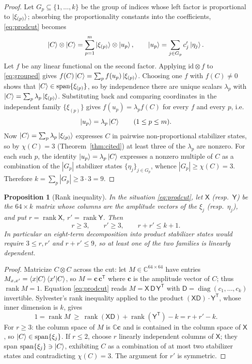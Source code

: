 \documentclass[11pt]{article}
\theoremstyle{plain}
\newtheorem{proposition}[theorem]{Proposition}
\theoremstyle{definition}
\newcommand{\C}{\mathbb{C}}
\newcommand{\rank}{\operatorname{rank}}
\newcommand{\spn}{\operatorname{span}}
\begin{document}
\begin{proof}
Let $G_p\subseteq\{1,\dots,k\}$ be the group of indices whose left factor is
proportional to $\ket{\xi_{(p)}}$; absorbing the proportionality constants into the
coefficients, \eqref{eq:prodcut} becomes
\begin{equation}\label{eq:grouped}
\ket C\otimes\ket C=\sum_{p=1}^m \ket{\xi_{(p)}}\otimes\ket{u_p},
\qquad \ket{u_p}=\sum_{j\in G_p}c_j'\ket{\eta_j}.
\end{equation}
Let $f$ be any linear functional on the second factor. Applying
$\mathrm{id}\otimes f$ to \eqref{eq:grouped} gives
$f(C)\ket C=\sum_p f(u_p)\ket{\xi_{(p)}}$. Choosing one $f$ with $f(C)\ne0$ shows
that $\ket C\in\spn\{\xi_{(p)}\}$, so by independence there are unique scalars
$\lambda_p$ with $\ket C=\sum_p\lambda_p\ket{\xi_{(p)}}$. Substituting back and
comparing coordinates in the independent family $\{\xi_{(p)}\}$ gives
$f(u_p)=\lambda_pf(C)$ for every $f$ and every $p$, i.e.
\[
\ket{u_p}=\lambda_p\ket C\qquad(1\le p\le m).
\]
Now $\ket C=\sum_p\lambda_p\ket{\xi_{(p)}}$ expresses $C$ in pairwise
non-proportional stabilizer states, so by $\chi(C)=3$ (Theorem~\ref{thm:cited}) at
least three of the $\lambda_p$ are nonzero. For each such $p$, the identity
$\ket{u_p}=\lambda_p\ket C$ expresses a nonzero multiple of $C$ as a combination of the
$|G_p|$ stabilizer states $\{\eta_j\}_{j\in G_p}$, whence $|G_p|\ge\chi(C)=3$.
Therefore $k=\sum_p|G_p|\ge3\cdot3=9$.
\end{proof}

\begin{proposition}[Rank inequality]\label{prop:sylvester}
In the situation \eqref{eq:prodcut}, let $\mathsf X$ (resp.\ $\mathsf Y$) be the
$64\times k$ matrix whose columns are the amplitude vectors of the $\xi_j$ (resp.\
$\eta_j$), and put $r=\rank\mathsf X$, $r'=\rank\mathsf Y$. Then
\[
r\ge3,\qquad r'\ge3,\qquad r+r'\le k+1 .
\]
In particular an eight-term decomposition into product stabilizer states would require
$3\le r,r'$ and $r+r'\le9$, so at least one of the two families is linearly dependent.
\end{proposition}

\begin{proof}
Matricize $C\otimes C$ across the cut: let $M\in\C^{64\times64}$ have entries
$M_{x,x'}=\braket{x|C}\braket{x'|C}$, so $M=\mathbf c\,\mathbf c^{\mathsf T}$ where
$\mathbf c$ is the amplitude vector of $C$; thus $\rank M=1$. Equation
\eqref{eq:prodcut} reads $M=\mathsf X\,\mathsf D\,\mathsf Y^{\mathsf T}$ with
$\mathsf D=\operatorname{diag}(c_1,\dots,c_k)$ invertible. Sylvester's rank inequality
applied to the product $(\mathsf X\mathsf D)\cdot\mathsf Y^{\mathsf T}$, whose inner
dimension is $k$, gives
\[
1=\rank M\ \ge\ \rank(\mathsf X\mathsf D)+\rank(\mathsf Y^{\mathsf T})-k=r+r'-k .
\]
For $r\ge3$: the column space of $M$ is $\C\mathbf c$ and is contained in the column
space of $\mathsf X$, so $\ket C\in\spn\{\xi_j\}$. If $r\le2$, choose $r$ linearly
independent columns of $\mathsf X$; they span $\spn\{\xi_j\}\ni\ket C$, exhibiting
$C$ as a combination of at most two stabilizer states and contradicting $\chi(C)=3$.
The argument for $r'$ is symmetric.
\end{proof}
\end{document}
